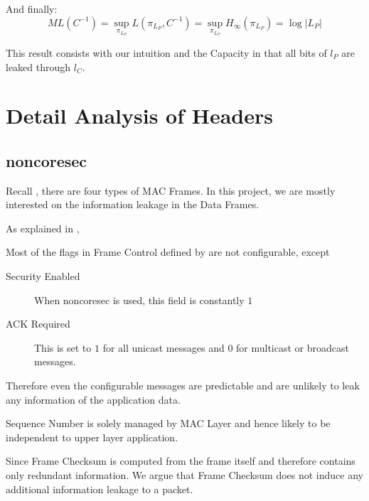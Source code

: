 And finally:
\begin{equation}
	ML(C^{-1}) = \sup_{\pi_{L_P}}{L(\pi_{L_P},C^{-1})} =  \sup_{\pi_{L_P}} H_{\infty}(\pi_{L_P}) = \log{|L_P|}
\end{equation}

This result consists with our intuition and the Capacity in  that all bits of $l_P$ are leaked through $l_C$.

\chapter{Detail Analysis of Headers}

\section{noncoresec} \label{Detail noncoresec Header}

Recall , there are four types of MAC Frames. In this project, we are mostly interested on the information leakage in the Data Frames.

As explained in ,

\begin{description}[style=nextline]
	\item[Frame Control]
	Most of the flags in Frame Control defined by \cite{802154} are not configurable, except
		\begin{description}
			\item[Security Enabled]
			When noncoresec is used, this field is constantly $1$
			\item[ACK Required]
			This is set to $1$ for all unicast messages and $0$ for multicast or broadcast messages.
		\end{description}
	Therefore even the configurable messages are predictable and are unlikely to leak any information of the application data.
	
	\item[Sequence Number]
	Sequence Number is solely managed by MAC Layer and hence likely to be independent to upper layer application.
	
	\item[Frame Checksum]
	Since Frame Checksum is computed from the frame itself and therefore contains only redundant information. We argue that Frame Checksum does not induce any additional information leakage to a packet.
\end{description}

